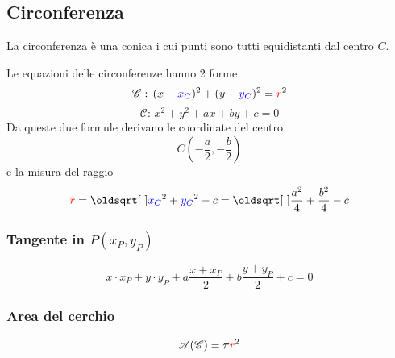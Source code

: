 \subsection{Circonferenza}\label{subsec:geomana:circ}
La circonferenza è una conica i cui punti sono tutti equidistanti dal centro $C$.
\begin{center}
\end{center}
Le equazioni delle circonferenze hanno 2 forme
\begin{equation*}
  \mathscr{C}:\,(x-\mathcolor{blue}{x_C})^2 + (y-\mathcolor{blue}{y_C})^2 = \mathcolor{red}{r}^2
\end{equation*}
\begin{equation*}
  \mathscr{C}:\,x^2+y^2+ax+by+c =0
\end{equation*}
Da queste due formule derivano le coordinate del centro
\begin{equation*}
  C\left(-\frac{a}{2},-\frac{b}{2}\right)
\end{equation*}
e la misura del raggio
\begin{equation*}
  \mathcolor{red}{r} = \sqrt{\mathcolor{blue}{x_C}^2+\mathcolor{blue}{y_C}^2-c} = 
  \sqrt{\frac{a^2}{4}+\frac{b^2}{4}-c}
\end{equation*}

\subsubsection{Tangente in $P(x_P,y_P)$}
\begin{equation*}
  x\cdot x_P+y\cdot y_P+a\frac{x+x_P}{2}+b\frac{y+y_P}{2}+c = 0
\end{equation*}

\subsubsection{Area del cerchio}
\begin{equation*}
  \mathscr{A}(\mathscr{C}) = \pi\mathcolor{red}{r}^2
\end{equation*}

